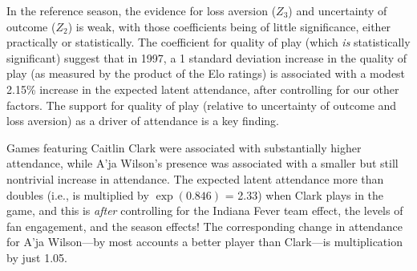 \documentclass[
  letterpaper,
  DIV=11,
  numbers=noendperiod]{scrartcl}
\begin{document}
\begin{table}

\caption{\label{tbl-coefs}Fitted coefficients for scalar terms in Tobit
model for the natural logarithm of attendance.}


\end{table}%

In the reference season, the evidence for loss aversion (\(Z_3\)) and
uncertainty of outcome (\(Z_2\)) is weak, with those coefficients being
of little significance, either practically or statistically. The
coefficient for quality of play (which \emph{is} statistically
significant) suggest that in 1997, a 1 standard deviation increase in
the quality of play (as measured by the product of the Elo ratings) is
associated with a modest 2.15\% increase in the expected latent
attendance, after controlling for our other factors. The support for
quality of play (relative to uncertainty of outcome and loss aversion)
as a driver of attendance is a key finding.

Games featuring Caitlin Clark were associated with substantially higher
attendance, while A'ja Wilson's presence was associated with a smaller
but still nontrivial increase in attendance. The expected latent
attendance more than doubles (i.e., is multiplied by
\(\exp(\text{0.846})\) = 2.33) when Clark plays in the game, and this is
\emph{after} controlling for the Indiana Fever team effect, the levels
of fan engagement, and the season effects! The corresponding change in
attendance for A'ja Wilson---by most accounts a better player than
Clark---is multiplication by just 1.05.
\end{document}
